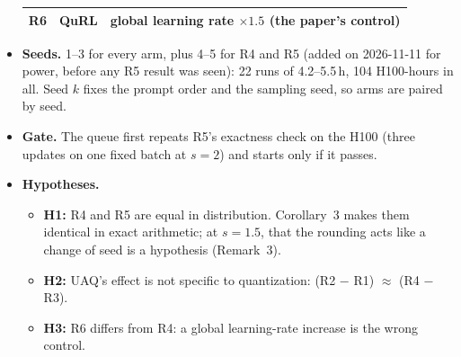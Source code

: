 \documentclass[11pt]{article}
\begin{document}
\begin{itemize}
\begin{center}
\begin{tabular}{@{}lll@{}}
R6 & QuRL & global learning rate $\times1.5$ (the paper's control)\\
\bottomrule
\end{tabular}
\end{center}
\item \textbf{Seeds.} 1--3 for every arm, plus 4--5 for R4 and R5 (added on 2026-11-11 for power, before any R5 result was seen): 22 runs of 4.2--5.5\,h, 104 H100-hours in all. Seed $k$ fixes the prompt order and the sampling seed, so arms are paired by seed.
\item \textbf{Gate.} The queue first repeats R5's exactness check on the H100 (three updates on one fixed batch at $s=2$) and starts only if it passes.
\item \textbf{Hypotheses.}
  \begin{itemize}
  \item \textbf{H1:} R4 and R5 are equal in distribution. Corollary~3 makes them identical in exact arithmetic; at $s=1.5$, that the rounding acts like a change of seed is a hypothesis (Remark~3).
  \item \textbf{H2:} UAQ's effect is not specific to quantization: (R2 $-$ R1) $\approx$ (R4 $-$ R3).
  \item \textbf{H3:} R6 differs from R4: a global learning-rate increase is the wrong control.
  \end{itemize}
\end{itemize}
\end{document}
